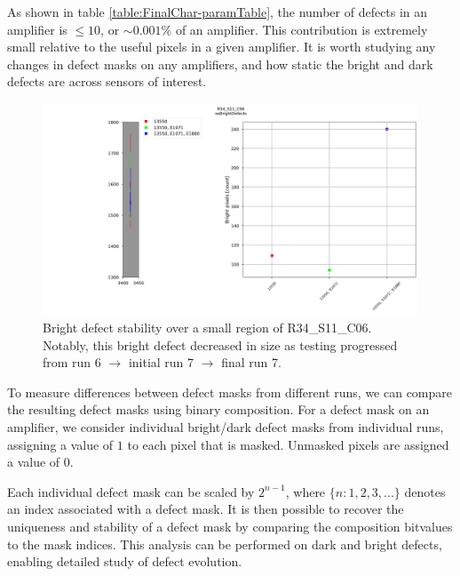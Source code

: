 As shown in table \ref{table:FinalChar-paramTable}, the number of defects in an amplifier is $\leq 10$, or $\sim0.001 \%$ of an amplifier. This contribution is extremely small relative to the useful pixels in a given amplifier. It is worth studying any changes in defect masks on any amplifiers, and how static the bright and dark defects are across sensors of interest.

\begin{figure}[ht]
    \centering
    \includegraphics[width=\linewidth]{figures/R34_S11_C06(1).jpg}
    \caption{Bright defect stability over a small region of R34\_S11\_C06. Notably, this bright defect decreased in size as testing progressed from run 6 $\rightarrow$ initial run 7 $\rightarrow$ final run 7.}
    \label{fig:BrightDefectStability}
\end{figure}

To measure differences between defect masks from different runs, we can compare the resulting defect masks using binary composition. For a defect mask on an amplifier, we consider individual bright/dark defect masks from individual runs, assigning a value of $1$ to each pixel that is masked. Unmasked pixels are assigned a value of $0$.


Each individual defect mask can be scaled by $2^{n-1}$, where $\{n:1,2,3,... \}$ denotes an index associated with a defect mask. It is then possible to recover the uniqueness and stability of a defect mask by comparing the composition bitvalues to the mask indices. This analysis can be performed on dark and bright defects, enabling detailed study of defect evolution. 

